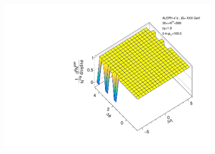 \begin{figure}[htbp]
\begin{minipage}[b]{0.32\linewidth}
  \end{minipage}
  \begin{minipage}[b]{0.32\linewidth}
    \centering
    \includegraphics[width=\linewidth]{images/TwoParticleCorrelation/LEP1_THRUST/LEP1_THRUST_r_ratio_30_999.pdf}
    \label{fig:LEP1 Thrust Axis, Ratio Plot, Multiplicity 30-999, Ratio}
  \end{minipage}
\end{figure}

